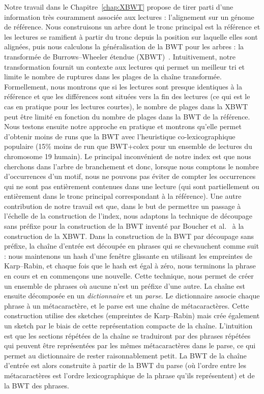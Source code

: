 Notre travail dans le Chapitre~\ref{chap:XBWT} propose de tirer parti d'une information très couramment associée aux lectures : l'alignement sur un génome de référence. Nous construisons un arbre dont le tronc principal est la référence et les lectures se ramifient à partir du tronc depuis la position sur laquelle elles sont alignées, puis nous calculons la généralisation de la BWT pour les arbres : la transformée de Burrows--Wheeler étendue (XBWT)~\cite{ferragina2009compressing}. Intuitivement, notre transformation fournit un contexte aux lectures qui permet un meilleur tri et limite le nombre de ruptures dans les plages de la chaîne transformée. Formellement, nous montrons que si les lectures sont presque identiques à la référence et que les différences sont situées vers la fin des lectures (ce qui est le cas en pratique pour les lectures courtes), le nombre de plages dans la XBWT peut être limité en fonction du nombre de plages dans la BWT de la référence. Nous testons ensuite notre approche en pratique et montrons qu'elle permet d'obtenir moins de runs que la BWT avec l'heuristique co-lexicographique populaire (15\% moins de run que BWT+colex pour un ensemble de lectures du chromosome 19 humain).
Le principal inconvénient de notre index est que nous cherchons dans l'arbre de branchement et donc, lorsque nous comptons le nombre d'occurrences d'un motif, nous ne pouvons pas éviter de compter les occurrences qui ne sont pas entièrement contenues dans une lecture (qui sont partiellement ou entièrement dans le tronc principal correspondant à la référence).
%
Une autre contribution de notre travail est que, dans le but de permettre un passage à l'échelle de la construction de l'index, nous adaptons la technique de découpage sans préfixe pour la construction de la BWT inventé par Boucher et al.~\cite{boucher2019prefix} à la construction de la XBWT. 
%
Dans la construction de la BWT par découpage sans préfixe, la chaîne d'entrée est découpée en phrases qui se chevauchent comme suit : nous maintenons un hash d'une fenêtre glissante en utilisant les empreintes de Karp--Rabin, et chaque fois que le hash est égal à zéro, nous terminons la phrase en cours et en commençons une nouvelle. Cette technique, nous permet de créer un ensemble de phrases où aucune n'est un préfixe d'une autre.
La chaîne est ensuite décomposée en un \emph{dictionnaire} et un \emph{parse}. 
Le dictionnaire associe chaque phrase à un métacaractère, et le parse est une chaîne de métacaractères.
Cette construction utilise des sketches (empreintes de Karp--Rabin) mais crée également un sketch par le biais de cette représentation compacte de la chaîne.
L'intuition est que les sections répétées de la chaîne se traduiront par des phrases répétées qui peuvent être représentées par les mêmes métacaractères dans le parse, ce qui permet au dictionnaire de rester raisonnablement petit.
La BWT de la chaîne d'entrée est alors construite à partir de la BWT du parse (où l'ordre entre les métacaractères est l'ordre lexicographique de la phrase qu'ils représentent) et de la BWT des phrases.

